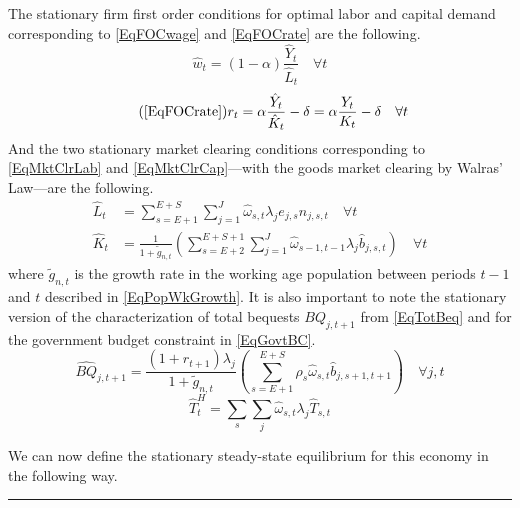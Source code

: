 \documentclass[letterpaper,12pt]{article}
\theoremstyle{definition}
\begin{document}
\begin{spacing}{1.5}
    The stationary firm first order conditions for optimal labor and capital demand corresponding to \eqref{EqFOCwage} and \eqref{EqFOCrate} are the following.
    \begin{equation}\label{EqFOCwageStat}
       \hat{w}_t = (1-\alpha)\frac{\hat{Y}_t}{\hat{L}_t} \quad \forall t
    \end{equation}
    \begin{equation}\tag{\ref{EqFOCrate}}
       r_t = \alpha\frac{\hat{Y}_t}{\hat{K}_t} - \delta = \alpha\frac{Y_t}{K_t} - \delta \quad \forall t
    \end{equation}
    And the two stationary market clearing conditions corresponding to \eqref{EqMktClrLab} and \eqref{EqMktClrCap}---with the goods market clearing by Walras' Law---are the following.
    \begin{align}
      \hat{L}_t &= \sum_{s=E+1}^{E+S}\sum_{j=1}^{J} \hat{\omega}_{s,t}\lambda_j e_{j,s}n_{j,s,t} \quad \forall t \label{EqMktClrLabStat} \\
      \hat{K}_t &= \frac{1}{1 + \tilde{g}_{n,t}}\left(\sum_{s=E+2}^{E+S+1}\sum_{j=1}^{J}\hat{\omega}_{s-1,t-1}\lambda_j \hat{b}_{j,s,t}\right) \quad \forall t \label{EqMktClrCapStat}
    \end{align}
    where $\tilde{g}_{n,t}$ is the growth rate in the working age population between periods $t-1$ and $t$ described in \eqref{EqPopWkGrowth}. It is also important to note the stationary version of the characterization of total bequests $BQ_{j,t+1}$ from \eqref{EqTotBeq} and for the government budget constraint in \eqref{EqGovtBC}.
    \begin{equation}\label{EqTotBeqStat}
      \hat{BQ}_{j,t+1} = \frac{(1+r_{t+1})\lambda_j}{1+\tilde{g}_{n,t}}\left(\sum_{s=E+1}^{E+S}\rho_s\hat{\omega}_{s,t}\hat{b}_{j,s+1,t+1}\right) \quad\forall j,t
    \end{equation}
    \begin{equation}\label{EqGovtBCstat}
      \hat{T}^H_t = \sum_s \sum_j \hat{\omega}_{s,t}\lambda_j \hat{T}_{s,t}
    \end{equation}

    We can now define the stationary steady-state equilibrium for this economy in the following way.

    \vspace{7mm}
    \end{spacing}
    \hrule
\end{document}
